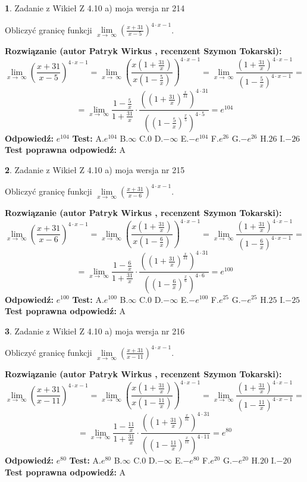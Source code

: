 \documentclass[12pt, a4paper]{article}
\theoremstyle{definition} %
\newtheorem{zad}{}
\newcommand{\zadStart}[1]{\begin{zad}#1\newline}
\newcommand{\zadStop}{\end{zad}}
\newcommand{\rozwStart}[2]{\noindent \textbf{Rozwiązanie (autor #1 , recenzent #2): }\newline}
\newcommand{\rozwStop}{\newline}
\newcommand{\odpStart}{\noindent \textbf{Odpowiedź:}\newline}
\newcommand{\odpStop}{\newline}
\newcommand{\testStart}{\noindent \textbf{Test:}\newline}
\newcommand{\testStop}{\newline}
\newcommand{\kluczStart}{\noindent \textbf{Test poprawna odpowiedź:}\newline}
\newcommand{\kluczStop}{\newline}
\begin{document}
\zadStart{Zadanie z Wikieł Z 4.10 a) moja wersja nr 214}

Obliczyć granicę funkcji  $\lim\limits_{x\to\ \infty}(\frac{x+31}{x-5})^{4\cdot x-1}$.
\zadStop
\rozwStart{Patryk Wirkus}{Szymon Tokarski}
$$\lim\limits_{x\to\ \infty}(\frac{x+31}{x-5})^{4\cdot x-1} = \lim\limits_{x\to\ \infty}(\frac{x(1+\frac{31}{x})}{x(1-\frac{5}{x})})^{4\cdot x-1}=\lim\limits_{x\to\ \infty}\frac{(1+\frac{31}{x})^{4\cdot x-1}}{(1-\frac{5}{x})^{4\cdot x-1}}=$$
$$=\lim\limits_{x\to\ \infty}\frac{1-\frac{5}{x}}{1+\frac{31}{x}}\cdot\frac{((1+\frac{31}{x})^{\frac{x}{31}})^{4\cdot31}}{((1-\frac{5}{x})^{\frac{x}{5}})^{4\cdot5}}=e^{104}$$
\rozwStop
\odpStart
$e^{104}$
\odpStop
\testStart
A.$e^{104}$ B.$\infty$ C.$0$ D.$-\infty$ E.$-e^{104}$
F.$e^{26}$ G.$-e^{26}$
H.$26$
I.$-26$
\testStop
\kluczStart
A
\kluczStop



\zadStart{Zadanie z Wikieł Z 4.10 a) moja wersja nr 215}

Obliczyć granicę funkcji  $\lim\limits_{x\to\ \infty}(\frac{x+31}{x-6})^{4\cdot x-1}$.
\zadStop
\rozwStart{Patryk Wirkus}{Szymon Tokarski}
$$\lim\limits_{x\to\ \infty}(\frac{x+31}{x-6})^{4\cdot x-1} = \lim\limits_{x\to\ \infty}(\frac{x(1+\frac{31}{x})}{x(1-\frac{6}{x})})^{4\cdot x-1}=\lim\limits_{x\to\ \infty}\frac{(1+\frac{31}{x})^{4\cdot x-1}}{(1-\frac{6}{x})^{4\cdot x-1}}=$$
$$=\lim\limits_{x\to\ \infty}\frac{1-\frac{6}{x}}{1+\frac{31}{x}}\cdot\frac{((1+\frac{31}{x})^{\frac{x}{31}})^{4\cdot31}}{((1-\frac{6}{x})^{\frac{x}{6}})^{4\cdot6}}=e^{100}$$
\rozwStop
\odpStart
$e^{100}$
\odpStop
\testStart
A.$e^{100}$ B.$\infty$ C.$0$ D.$-\infty$ E.$-e^{100}$
F.$e^{25}$ G.$-e^{25}$
H.$25$
I.$-25$
\testStop
\kluczStart
A
\kluczStop



\zadStart{Zadanie z Wikieł Z 4.10 a) moja wersja nr 216}

Obliczyć granicę funkcji  $\lim\limits_{x\to\ \infty}(\frac{x+31}{x-11})^{4\cdot x-1}$.
\zadStop
\rozwStart{Patryk Wirkus}{Szymon Tokarski}
$$\lim\limits_{x\to\ \infty}(\frac{x+31}{x-11})^{4\cdot x-1} = \lim\limits_{x\to\ \infty}(\frac{x(1+\frac{31}{x})}{x(1-\frac{11}{x})})^{4\cdot x-1}=\lim\limits_{x\to\ \infty}\frac{(1+\frac{31}{x})^{4\cdot x-1}}{(1-\frac{11}{x})^{4\cdot x-1}}=$$
$$=\lim\limits_{x\to\ \infty}\frac{1-\frac{11}{x}}{1+\frac{31}{x}}\cdot\frac{((1+\frac{31}{x})^{\frac{x}{31}})^{4\cdot31}}{((1-\frac{11}{x})^{\frac{x}{11}})^{4\cdot11}}=e^{80}$$
\rozwStop
\odpStart
$e^{80}$
\odpStop
\testStart
A.$e^{80}$ B.$\infty$ C.$0$ D.$-\infty$ E.$-e^{80}$
F.$e^{20}$ G.$-e^{20}$
H.$20$
I.$-20$
\testStop
\kluczStart
A
\kluczStop
\end{document}
